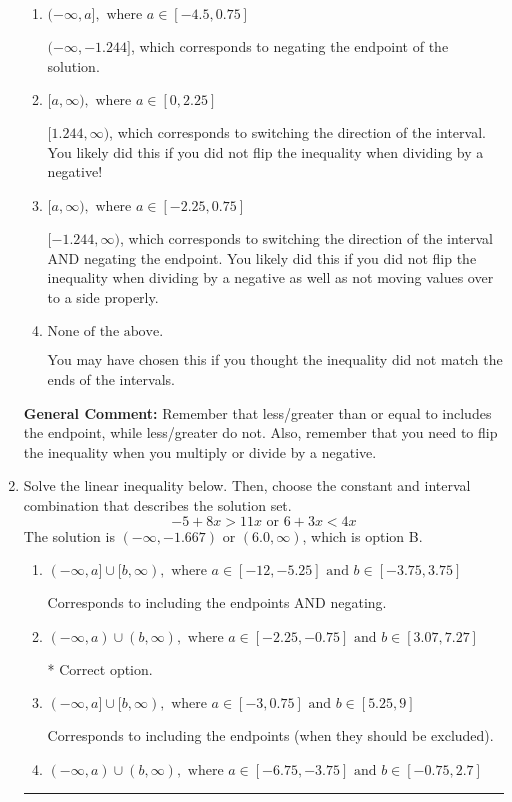 \documentclass{extbook}[14pt]
\newcommand{\litem}[1]{\item #1

\rule{\textwidth}{0.4pt}}
\begin{document}
\begin{enumerate}
{\begin{enumerate}[label=\Alph*.]
* $(-\infty, 1.244]$, which is the correct option.
\item \( (-\infty, a], \text{ where } a \in [-4.5, 0.75] \)

 $(-\infty, -1.244]$, which corresponds to negating the endpoint of the solution.
\item \( [a, \infty), \text{ where } a \in [0, 2.25] \)

 $[1.244, \infty)$, which corresponds to switching the direction of the interval. You likely did this if you did not flip the inequality when dividing by a negative!
\item \( [a, \infty), \text{ where } a \in [-2.25, 0.75] \)

 $[-1.244, \infty)$, which corresponds to switching the direction of the interval AND negating the endpoint. You likely did this if you did not flip the inequality when dividing by a negative as well as not moving values over to a side properly.
\item \( \text{None of the above}. \)

You may have chosen this if you thought the inequality did not match the ends of the intervals.
\end{enumerate}

\textbf{General Comment:} Remember that less/greater than or equal to includes the endpoint, while less/greater do not. Also, remember that you need to flip the inequality when you multiply or divide by a negative.
}
\litem{
Solve the linear inequality below. Then, choose the constant and interval combination that describes the solution set.
\[ -5 + 8 x > 11 x \text{ or } 6 + 3 x < 4 x \]The solution is \( (-\infty, -1.667) \text{ or } (6.0, \infty) \), which is option B.\begin{enumerate}[label=\Alph*.]
\item \( (-\infty, a] \cup [b, \infty), \text{ where } a \in [-12, -5.25] \text{ and } b \in [-3.75, 3.75] \)

Corresponds to including the endpoints AND negating.
\item \( (-\infty, a) \cup (b, \infty), \text{ where } a \in [-2.25, -0.75] \text{ and } b \in [3.07, 7.27] \)

 * Correct option.
\item \( (-\infty, a] \cup [b, \infty), \text{ where } a \in [-3, 0.75] \text{ and } b \in [5.25, 9] \)

Corresponds to including the endpoints (when they should be excluded).
\item \( (-\infty, a) \cup (b, \infty), \text{ where } a \in [-6.75, -3.75] \text{ and } b \in [-0.75, 2.7] \)


\end{enumerate}}
\end{enumerate}
\end{document}
